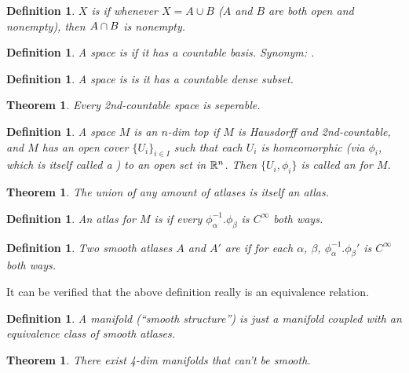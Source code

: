 \documentclass[11pt]{amsbook}
\theoremstyle{mystyle} %
\newtheorem{thrm}[thm]{Theorem}
\newtheorem{defi}[thm]{Definition}
\numberwithin{thm}{section}
\begin{document}
\begin{defi}
	$X$ is  if whenever $X = A \cup B$ ($A$ and $B$ are both open and nonempty), then $A \cap B$ is nonempty.
\end{defi}

\begin{defi}
	A space is  if it has a countable basis.  Synonym: .
\end{defi}
\begin{defi}
	A space is  is it has a countable dense subset.
\end{defi}
\begin{thrm}
	Every 2nd-countable space is seperable.
\end{thrm}
\begin{defi}
	A space $M$ is an $n$-dim top  if $M$ is Hausdorff and 2nd-countable, and $M$ has an open cover $\{U_i\}_{i \in I}$ such that each $U_i$ is homeomorphic (via $\phi_i$, which is itself called a ) to an open set in ${\mathbb R}^n$.  Then $\{ U_i, \phi_i \}$ is called an  for $M$.
\end{defi}
\begin{thrm}
	The union of any amount of atlases is itself an atlas.
\end{thrm}

\begin{defi}
	An atlas for $M$ is  if every $\phi_\alpha^{-1}.\phi_\beta$ is $C^\infty$ both ways.
\end{defi}

\begin{defi}
	Two smooth atlases $A$ and $A'$ are  if for each $\alpha$, $\beta$, $\phi_\alpha^{-1}.\phi_\beta'$ is $C^\infty$ both ways.
\end{defi}
\begin{rmk}
	It can be verified that the above definition really is an equivalence relation.
\end{rmk}

\begin{defi}
	A  manifold (``smooth structure'') is just a manifold coupled with an equivalence class of smooth atlases.
\end{defi}

\begin{thrm}
	There exist 4-dim manifolds that can't be smooth.
\end{thrm}
\end{document}
